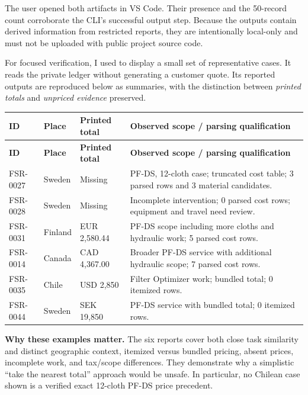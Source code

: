 \documentclass[11pt,a4paper]{article}
\DeclareRobustCommand{\code}[1]{{\ttfamily\small\detokenize{#1}}}
\begin{document}
The user opened both artifacts in VS Code. Their presence and the 50-record count corroborate the CLI's successful output step. Because the outputs contain derived information from restricted reports, they are intentionally local-only and must not be uploaded with public project source code.

For focused verification, I used \code{scripts/review_stage04.py} to display a small set of representative cases. It reads the private ledger without generating a customer quote. Its reported outputs are reproduced below as summaries, with the distinction between \emph{printed totals} and \emph{unpriced evidence} preserved.

\begin{longtable}{@{}L{18mm}L{26mm}L{32mm}L{68mm}@{}}
\toprule
\textbf{ID} & \textbf{Place} & \textbf{Printed total} & \textbf{Observed scope / parsing qualification}\\
\midrule\endfirsthead
\toprule
\textbf{ID} & \textbf{Place} & \textbf{Printed total} & \textbf{Observed scope / parsing qualification}\\
\midrule\endhead
FSR-0027 & Sweden & Missing & PF-DS, 12-cloth case; truncated cost table; 3 parsed rows and 3 material candidates.\\
FSR-0028 & Sweden & Missing & Incomplete intervention; 0 parsed cost rows; equipment and travel need review.\\
FSR-0031 & Finland & EUR 2,580.44 & PF-DS scope including more cloths and hydraulic work; 5 parsed cost rows.\\
FSR-0014 & Canada & CAD 4,367.00 & Broader PF-DS service with additional hydraulic scope; 7 parsed cost rows.\\
FSR-0035 & Chile & USD 2,850 & Filter Optimizer work; bundled total; 0 itemized rows.\\
FSR-0044 & Sweden & SEK 19,850 & PF-DS service with bundled total; 0 itemized rows.\\
\bottomrule
\end{longtable}

\textbf{Why these examples matter.} The six reports cover both close task similarity and distinct geographic context, itemized versus bundled pricing, absent prices, incomplete work, and tax/scope differences. They demonstrate why a simplistic ``take the nearest total'' approach would be unsafe. In particular, no Chilean case shown is a verified exact 12-cloth PF-DS price precedent.
\end{document}
